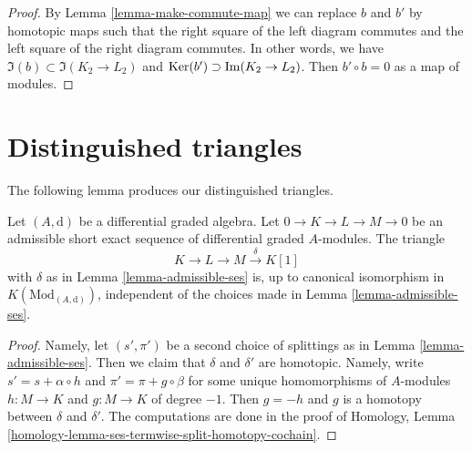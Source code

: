 \begin{proof}
By Lemma \ref{lemma-make-commute-map} we can replace $b$ and $b'$ by
homotopic maps such that the right square of the left diagram commutes
and the left square of the right diagram commutes. In other words, we have
$\Im(b) \subset \Im(K_2 \to L_2)$ and
$\mathop{\mathrm{Ker}}(b') \supset \mathop{\mathrm{Im}}(K_2 \to L_2)$.
Then $b' \circ b = 0$ as a map of modules.
\end{proof}
















\section{Distinguished triangles}
\label{section-distinguished}

\noindent
The following lemma produces our distinguished triangles.

\begin{lemma}
\label{lemma-triangle-independent-splittings}
Let $(A, \text{d})$ be a differential graded algebra. Let
$0 \to K \to L \to M \to 0$ be an admissible short exact sequence
of differential graded $A$-modules. The triangle
\begin{equation}
\label{equation-triangle-associated-to-admissible-ses}
K \to L \to M \xrightarrow{\delta} K[1]
\end{equation}
with $\delta$ as in Lemma \ref{lemma-admissible-ses} is, up to canonical
isomorphism in $K(\text{Mod}_{(A, \text{d})})$, independent of the choices
made in Lemma \ref{lemma-admissible-ses}.
\end{lemma}

\begin{proof}
Namely, let $(s', \pi')$ be a second choice of splittings as in
Lemma \ref{lemma-admissible-ses}. Then we claim that $\delta$ and $\delta'$
are homotopic. Namely, write $s' = s + \alpha \circ h$ and
$\pi' = \pi + g \circ \beta$ for some unique homomorphisms
of $A$-modules $h : M \to K$ and $g : M \to K$ of degree $-1$.
Then $g = -h$ and $g$ is a homotopy between $\delta$ and $\delta'$.
The computations are done in the proof of
Homology, Lemma \ref{homology-lemma-ses-termwise-split-homotopy-cochain}.
\end{proof}

